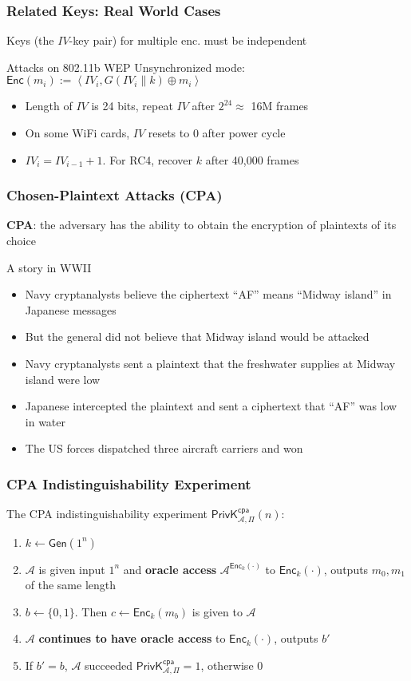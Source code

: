 \begin{frame}\frametitle{Related Keys: Real World Cases}
Keys (the $IV$-key pair) for multiple enc. must be independent
\begin{exampleblock}{Attacks on 802.11b WEP}
Unsynchronized mode: $\mathsf{Enc}(m_i) := \left< IV_i, G(IV_i\|k) \oplus m_i\right>$\\
\begin{itemize}
\item Length of $IV$ is 24 bits, repeat $IV$ after $2^{24} \approx$ 16M frames
\item On some WiFi cards, $IV$ resets to $0$ after power cycle
\item $IV_i = IV_{i-1} + 1$. For RC4, recover $k$ after 40,000 frames
\end{itemize}
\end{exampleblock}
\end{frame}
\begin{frame}\frametitle{Chosen-Plaintext Attacks (CPA)}
\textbf{CPA}: the adversary has the ability to obtain the encryption of plaintexts of its choice
\begin{exampleblock}{A story in WWII}
\begin{itemize}
\item Navy cryptanalysts believe the ciphertext ``AF'' means ``Midway island'' in Japanese messages
\item But the general did not believe that Midway island would be attacked
\item Navy cryptanalysts sent a plaintext that the freshwater supplies at Midway island were low
\item Japanese intercepted the plaintext and sent a ciphertext that ``AF'' was low in water
\item The US forces dispatched three aircraft carriers and won
\end{itemize}
\end{exampleblock}
\end{frame}
\begin{frame}\frametitle{CPA Indistinguishability Experiment}
The CPA indistinguishability experiment $\mathsf{PrivK}^{\mathsf{cpa}}_{\mathcal{A},\Pi}(n)$:
\begin{enumerate}
	\item $k \gets \mathsf{Gen}(1^n)$
	\item $\mathcal{A}$ is given input $1^n$ and \textbf{oracle access} $\mathcal{A}^{\mathsf{Enc}_k(\cdot)}$ to $\mathsf{Enc}_k(\cdot)$, outputs $m_0, m_1$ of the same length
	\item $b \gets \{0,1\}$. Then $c \gets \mathsf{Enc}_k(m_b)$ is given to $\mathcal{A}$
	\item $\mathcal{A}$ \textbf{continues to have oracle access} to $\mathsf{Enc}_k(\cdot)$, outputs $b'$
	\item If $b' = b$, $\mathcal{A}$ succeeded $\mathsf{PrivK}^{\mathsf{cpa}}_{\mathcal{A},\Pi}=1$, otherwise 0
\end{enumerate}
\begin{figure}
\begin{center}

\end{center}
\end{figure}
\end{frame}
